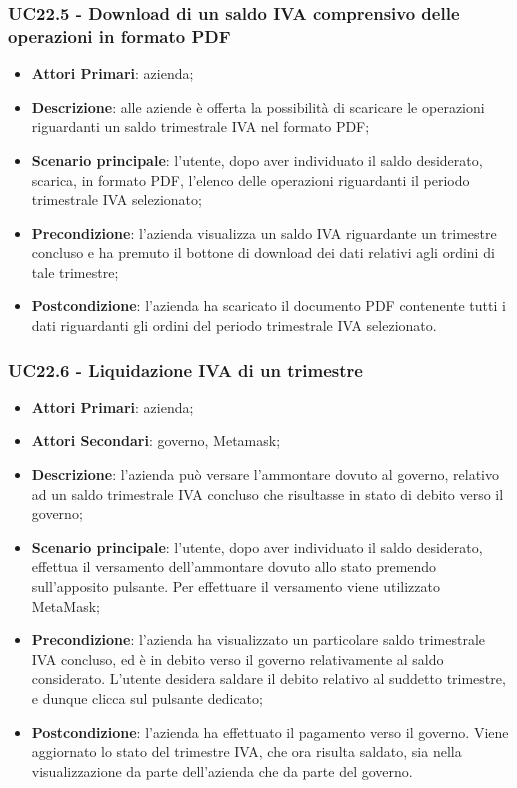 \subsubsection{UC22.5 - Download di un saldo IVA comprensivo delle operazioni in formato PDF}
\begin{itemize}
	\item \textbf{Attori Primari}: azienda;
	\item \textbf{Descrizione}: alle aziende è offerta la possibilità di scaricare le operazioni riguardanti un saldo trimestrale IVA nel formato PDF;
	\item \textbf{Scenario principale}: l'utente, dopo aver individuato il saldo desiderato, scarica, in formato PDF, l'elenco delle operazioni riguardanti il periodo trimestrale IVA selezionato;
	\item \textbf{Precondizione}: l'azienda visualizza un saldo IVA riguardante un trimestre concluso e ha premuto il bottone di download dei dati relativi agli ordini di tale trimestre;
	\item \textbf{Postcondizione}: l'azienda ha scaricato il documento PDF contenente tutti i dati riguardanti gli ordini del periodo trimestrale IVA selezionato.
\end{itemize} 

\subsubsection{UC22.6 - Liquidazione IVA di un trimestre}
\begin{itemize}
	\item \textbf{Attori Primari}: azienda;
	\item \textbf{Attori Secondari}: governo, Metamask\glo;
	\item \textbf{Descrizione}: l'azienda può versare l'ammontare dovuto al governo, relativo ad un saldo trimestrale IVA concluso che risultasse in stato di debito verso il governo;
	\item \textbf{Scenario principale}: l'utente, dopo aver individuato il saldo desiderato, effettua il versamento dell'ammontare dovuto allo stato premendo sull'apposito pulsante. Per effettuare il versamento viene utilizzato MetaMask\glo;
	\item \textbf{Precondizione}: l'azienda ha visualizzato un particolare saldo trimestrale IVA concluso, ed è in debito verso il governo relativamente al saldo considerato. L'utente desidera saldare il debito relativo al suddetto trimestre, e dunque clicca sul pulsante dedicato;
	\item \textbf{Postcondizione}: l'azienda ha effettuato il pagamento verso il governo. Viene aggiornato lo stato del trimestre IVA, che ora risulta saldato, sia nella visualizzazione da parte dell'azienda che da parte del governo.
\end{itemize} 

